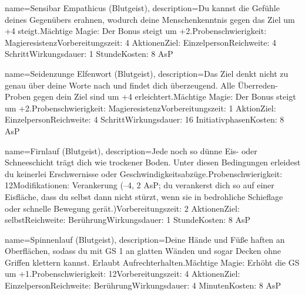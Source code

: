 {
    name={Sensibar Empathicus (Blutgeist)},
    description={Du kannst die Gefühle deines Gegenübers erahnen, wodurch deine Menschenkenntnis gegen das Ziel um +4 steigt.\newline Mächtige Magie: Der Bonus steigt um +2.\newline Probenschwierigkeit: Magieresistenz\newline Vorbereitungszeit: 4 Aktionen\newline Ziel: Einzelperson\newline Reichweite: 4 Schritt\newline Wirkungsdauer: 1 Stunde\newline Kosten: 8 AsP}
}


{
    name={Seidenzunge Elfenwort (Blutgeist)},
    description={Das Ziel denkt nicht zu genau über deine Worte nach und findet dich überzeugend. Alle Überreden-Proben gegen dein Ziel sind um +4 erleichtert.\newline Mächtige Magie: Der Bonus steigt um +2.\newline Probenschwierigkeit: Magieresistenz\newline Vorbereitungszeit: 1 Aktion\newline Ziel: Einzelperson\newline Reichweite: 4 Schritt\newline Wirkungsdauer: 16 Initiativphasen\newline Kosten: 8 AsP}
}


{
    name={Firnlauf (Blutgeist)},
    description={Jede noch so dünne Eis- oder Schneeschicht trägt dich wie trockener Boden. Unter diesen Bedingungen erleidest du keinerlei Erschwernisse oder Geschwindigkeitsabzüge.\newline Probenschwierigkeit: 12\newline Modifikationen: Verankerung (–4, 2 AsP; du verankerst dich so auf einer Eisfläche, dass du selbst dann nicht stürzt, wenn sie in bedrohliche Schieflage oder schnelle Bewegung gerät.)\newline Vorbereitungszeit: 2 Aktionen\newline Ziel: selbst\newline Reichweite: Berührung\newline Wirkungsdauer: 1 Stunde\newline Kosten: 8 AsP}
}


{
    name={Spinnenlauf (Blutgeist)},
    description={Deine Hände und Füße haften an Oberflächen, sodass du mit GS 1 an glatten Wänden und sogar Decken ohne Griffen klettern kannst. Erlaubt Aufrechterhalten.\newline Mächtige Magie: Erhöht die GS um +1.\newline Probenschwierigkeit: 12\newline Vorbereitungszeit: 4 Aktionen\newline Ziel: Einzelperson\newline Reichweite: Berührung\newline Wirkungsdauer: 4 Minuten\newline Kosten: 8 AsP}
}


